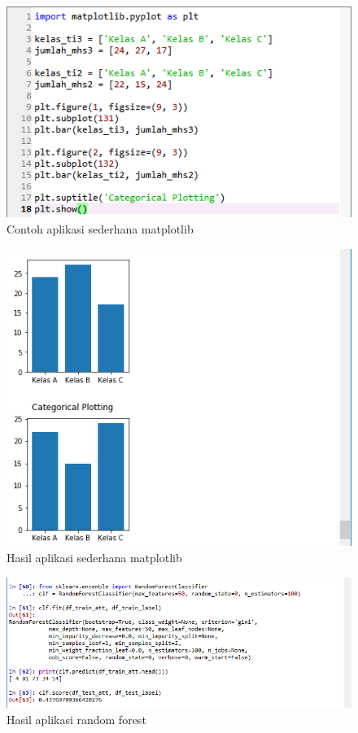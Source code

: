 \begin{figure}[ht]
      \centerline{\includegraphics[width=1\textwidth]
      {figures/cokro/c42}}
      \caption{Contoh aplikasi sederhana matplotlib}
      \label{c42}
      \end{figure}

\begin{figure}[ht]
      \centerline{\includegraphics[width=1\textwidth]
      {figures/cokro/c43}}
      \caption{Hasil aplikasi sederhana matplotlib}
      \label{c43}
      \end{figure}

\begin{figure}[ht]
      \centerline{\includegraphics[width=1\textwidth]
      {figures/cokro/c44}}
      \caption{Hasil aplikasi random forest}
      \label{c44}
      \end{figure}

